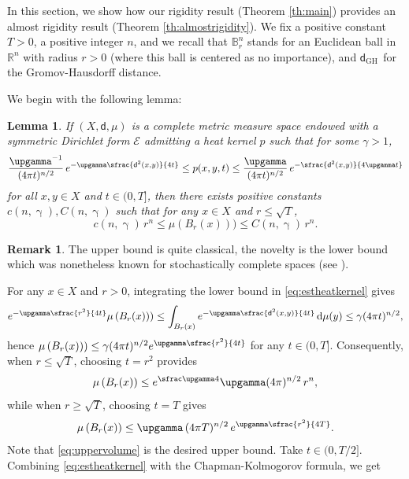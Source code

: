 \documentclass[10pt]{amsart}
\newcommand{\sGH}{{\scriptscriptstyle\mathrm{GH}\,}}
\theoremstyle{plain}
\newtheorem{lemma}[theorem]{Lemma}
\theoremstyle{definition}
\newtheorem{remark}[theorem]{Remark}
\newcommand{\setR}{\mathbb{R}}
\newcommand{\setB}{\mathbb{B}}
\newcommand{\cE}{\mathcal{E}}
\newcommand{\di}{\mathop{}\!\mathrm{d}}
\newcommand{\dist}{\mathsf{d}}
\begin{document}
In this section, we show how our rigidity result (Theorem \ref{th:main}) provides an almost rigidity result (Theorem \ref{th:almostrigidity}). We fix a positive constant $T>0$, a positive integer $n$, and we recall that $\setB^n_r$ stands for an Euclidean ball in $\setR^n$ with radius $r>0$ (where this ball is centered as no importance), and $\dist_{\sGH}$ for the Gromov-Hausdorff distance.

We begin with the following lemma:
\begin{lemma}\label{lem:voleu} If $(X,\dist,\mu)$ is a complete metric measure space endowed with a symmetric Dirichlet form $\cE$
admitting a heat kernel $p$ such that for some $\gamma >1$,
\begin{equation}\label{eq:estheatkernel}
\frac{\upgamma ^{-1}}{(4 \pi t)^{n/2}}\, e^{-\upgamma\sfrac{\dist^2(x,y)}{4t}}\le p(x,y,t) \le \frac{\upgamma }{(4 \pi t)^{n/2}}\, e^{-\sfrac{\dist^2(x,y)}{4\upgamma t}}
\end{equation}
for all $x, y \in X$ and $t \in (0,T]$, then there exists positive constants $c(n,\upgamma), C(n,\upgamma)$ such that for any $x\in X$ and $r\le \sqrt{T}$,
\[
c(n,\upgamma)\, r^n\le \mu(B_r(x)))\le C(n,\upgamma)\, r^n.
\]
\end{lemma}
\begin{remark} The upper bound is quite classical, the novelty is the lower bound which was nonetheless known for stochastically complete spaces (see \cite[Th.\,2.11]{Grigor'yan}).
\end{remark}
\proof For any $x \in X$ and $r>0$, integrating the lower bound in \eqref{eq:estheatkernel} gives
\[
e^{-\upgamma\sfrac{r^2}{4t}} \mu\left(B_r(x)) \right)\le \int_{B_r(x)} e^{-\upgamma\sfrac{\dist^2(x,y)}{4t}}\di\mu(y)\le \gamma (4 \pi t)^{n/2},
\]
hence $\mu\left(B_r(x)) \right)\le \gamma (4 \pi t)^{n/2} e^{\upgamma\sfrac{r^2}{4t}}$ for any $t \in (0,T]$. Consequently, when $r\le \sqrt{T}$, choosing $t=r^2$ provides
\begin{equation}\label{eq:uppervolume} \mu\left(B_r(x) \right)\le e^{\sfrac \upgamma 4} \upgamma(4 \pi)^{n/2}\, r^n,
\end{equation}
while when $r\ge \sqrt{T}$, choosing $t=T$ gives
\begin{equation}\label{eq:uppervolumeT}
\mu\left(B_r(x) \right)\le \upgamma\,(4 \pi T)^{n/2}\, e^{\upgamma\sfrac{r^2}{4T}}.
\end{equation}
Note that \eqref{eq:uppervolume} is the desired upper bound. Take $t \in (0,T/2]$. Combining \eqref{eq:estheatkernel} with the Chapman-Kolmogorov formula, we get
\end{document}
